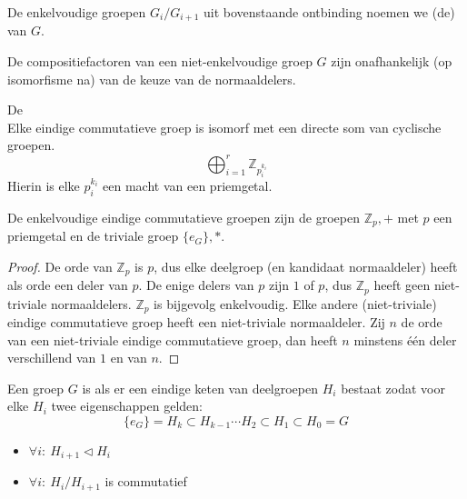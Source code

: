 \documentclass[main.tex]{subfiles}
\begin{document}
\begin{de}
  De enkelvoudige groepen $G_{i}/G_{i+1}$ uit bovenstaande ontbinding noemen we (de)  van $G$.
\end{de}

\begin{st}
  De compositiefactoren van een niet-enkelvoudige groep $G$ zijn onafhankelijk (op isomorfisme na) van de keuze van de normaaldelers.
  \zb
\end{st}

\begin{st}
  \label{st:structuurstelling}
  De \\
  Elke eindige commutatieve groep is isomorf met een directe som van cyclische groepen.
  \[ \bigoplus_{i=1}^{r} \mathbb{Z}_{p_{i}^{k_{i}}} \]
  Hierin is elke $p_{i}^{k_{i}}$ een macht van een priemgetal.
  \zb
\end{st}

\begin{pr}
  De enkelvoudige eindige commutatieve groepen zijn de groepen $\mathbb{Z}_{p},+$ met $p$ een priemgetal en de triviale groep $\{e_{G}\},*$.
  \begin{proof}
    De orde van $\mathbb{Z}_{p}$ is $p$, dus elke deelgroep (en kandidaat normaaldeler) heeft als orde een deler van $p$.
    De enige delers van $p$ zijn $1$ of $p$, dus $\mathbb{Z}_{p}$ heeft geen niet-triviale normaaldelers.
    $\mathbb{Z}_{p}$ is bijgevolg enkelvoudig.
    Elke andere (niet-triviale) eindige commutatieve groep heeft een niet-triviale normaaldeler.
    Zij $n$ de orde van een niet-triviale eindige commutatieve groep, dan heeft $n$ minstens \'e\'en deler verschillend van $1$ en van $n$.
  \end{proof}
\end{pr}

\begin{de}
  \label{de:oplosbaar}
  Een groep $G$ is  als er een eindige keten van deelgroepen $H_{i}$ bestaat zodat voor elke $H_{i}$ twee eigenschappen gelden:
  \[ \{e_{G}\} = H_{k} \subset H_{k-1} \dotsb H_{2} \subset H_{1} \subset H_{0} = G \]
  \begin{itemize}
  \item $\forall i:\ H_{i+1} \triangleleft H_{i}$
  \item $\forall i:\ H_{i}/H_{i+1}$ is commutatief
  \end{itemize}
\end{de}
\end{document}
